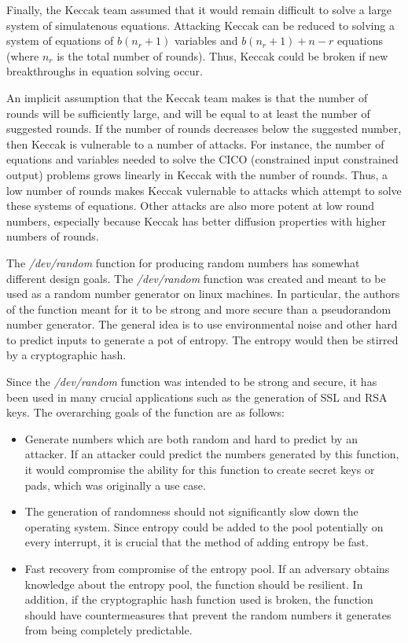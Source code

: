 \documentclass[psamsfonts]{amsart}
\begin{document}
Finally, the Keccak team assumed that it would remain difficult to solve a large system of simulatenous equations. Attacking Keccak can be reduced to solving a system of equations of $b(n_r + 1)$ variables and $b(n_r+1) + n -r$ equations (where $n_r$ is the total number of rounds). Thus, Keccak could be broken if new breakthroughs in equation solving occur.

An implicit assumption that the Keccak team makes is that the number of rounds will be sufficiently large, and will be equal to at least the number of suggested rounds. If the number of rounds decreases below the suggested number, then Keccak is vulnerable to a number of attacks. For instance, the number of equations and variables needed to solve the CICO (constrained input constrained output) problems grows linearly in Keccak with the number of rounds. Thus, a low number of rounds makes Keccak vulernable to attacks which attempt to solve these systems of equations. Other attacks are also more potent at low round numbers, especially because Keccak has better diffusion properties with higher numbers of rounds.

The \emph{/dev/random} function for producing random numbers has somewhat different design goals. The \emph{/dev/random} function was created and meant to be used as a random number generator on linux machines. In particular, the authors of the function meant for it to be strong and more secure than a pseudorandom number generator. The general idea is to use environmental noise and other hard to predict inputs to generate a pot of entropy. The entropy would then be stirred by a cryptographic hash.

Since the \emph{/dev/random} function was intended to be strong and secure, it has been used in many crucial applications such as the generation of SSL and RSA keys. The overarching goals of the function are as follows:
\begin{itemize}
  \item Generate numbers which are both random and hard to predict by an attacker. If an attacker could predict the numbers generated by this function, it would compromise the ability for this function to create secret keys or pads, which was originally a use case.
  \item The generation of randomness should not significantly slow down the operating system. Since entropy could be added to the pool potentially on every interrupt, it is crucial that the method of adding entropy be fast.
  \item Fast recovery from compromise of the entropy pool. If an adversary obtains knowledge about the entropy pool, the function should be resilient. In addition, if the cryptographic hash function used is broken, the function should have countermeasures that prevent the random numbers it generates from being completely predictable.
\end{itemize}
\end{document}
